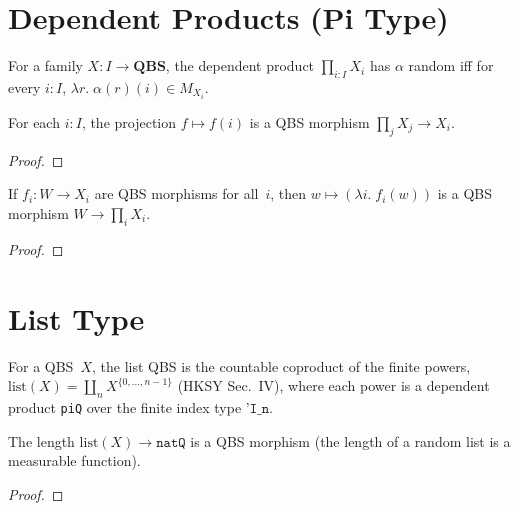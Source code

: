 \section{Dependent Products (Pi Type)}\label{sec:pi}

\begin{definition}\label{def:piQ}
  \rocqok
  For a family $X : I \to \mathbf{QBS}$, the dependent product
  $\prod_{i:I} X_i$ has $\alpha$ random iff for every $i : I$,
  $\lambda r.\; \alpha(r)(i) \in M_{X_i}$.
\end{definition}

\begin{lemma}\label{lem:qbs_morphism_proj}
  \rocqok
  For each $i : I$, the projection $f \mapsto f(i)$ is a QBS morphism
  $\prod_j X_j \to X_i$.
\end{lemma}
\begin{proof}\rocqok\end{proof}

\begin{lemma}\label{lem:qbs_morphism_tuple}
  \rocqok
  If $f_i : W \to X_i$ are QBS morphisms for all~$i$, then
  $w \mapsto (\lambda i.\; f_i(w))$ is a QBS morphism
  $W \to \prod_i X_i$.
\end{lemma}
\begin{proof}\rocqok\end{proof}


\section{List Type}\label{sec:list}

\begin{definition}\label{def:listQ}
  \rocqok
  For a QBS~$X$, the list QBS is the countable coproduct of the finite
  powers, $\mathrm{list}(X) = \coprod_{n} X^{\{0,\ldots,n-1\}}$
  (HKSY Sec.~IV), where each power is a dependent product
  \texttt{piQ} over the finite index type $\texttt{'I\_n}$.
\end{definition}

\begin{lemma}\label{lem:qbs_morphism_size}
  \rocqok
  The length $\mathrm{list}(X) \to \mathtt{natQ}$ is a QBS morphism
  (the length of a random list is a measurable function).
\end{lemma}
\begin{proof}\rocqok\end{proof}

